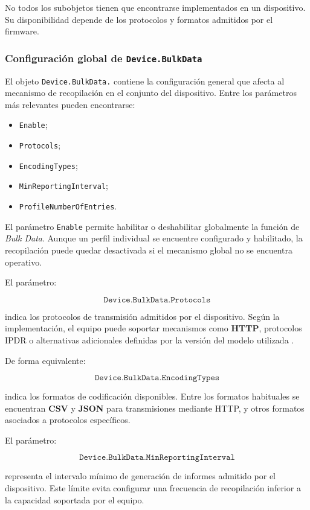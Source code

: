 No todos los subobjetos tienen que encontrarse implementados en un
dispositivo. Su disponibilidad depende de los protocolos y formatos
admitidos por el firmware.


\subsubsection*{Configuración global de \texttt{Device.BulkData}}

El objeto \texttt{Device.BulkData.} contiene la configuración general
que afecta al mecanismo de recopilación en el conjunto del dispositivo.
Entre los parámetros más relevantes pueden encontrarse:

\begin{itemize}
    \item \texttt{Enable};
    \item \texttt{Protocols};
    \item \texttt{EncodingTypes};
    \item \texttt{MinReportingInterval};
    \item \texttt{ProfileNumberOfEntries}.
\end{itemize}

El parámetro \texttt{Enable} permite habilitar o deshabilitar globalmente
la función de \textit{Bulk Data}. Aunque un perfil individual se
encuentre configurado y habilitado, la recopilación puede quedar
desactivada si el mecanismo global no se encuentra operativo.

El parámetro:

\[
    \texttt{Device.BulkData.Protocols}
\]

indica los protocolos de transmisión admitidos por el dispositivo. Según
la implementación, el equipo puede soportar mecanismos como
\textbf{HTTP}, protocolos IPDR o alternativas adicionales definidas por
la versión del modelo utilizada \cite{bbf_tr181}.

De forma equivalente:

\[
    \texttt{Device.BulkData.EncodingTypes}
\]

indica los formatos de codificación disponibles. Entre los formatos
habituales se encuentran \textbf{CSV} y \textbf{JSON} para transmisiones
mediante HTTP, y otros formatos asociados a protocolos específicos.

El parámetro:

\[
    \texttt{Device.BulkData.MinReportingInterval}
\]

representa el intervalo mínimo de generación de informes admitido por el
dispositivo. Este límite evita configurar una frecuencia de recopilación
inferior a la capacidad soportada por el equipo.

